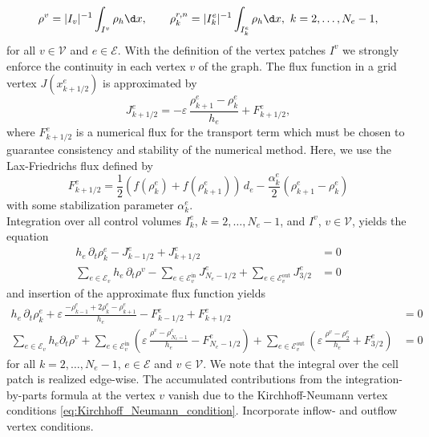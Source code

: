 \begin{align*}	
	\rho^{v}= |I_v|^{-1}\int_{I^v}\rho_h\d x, \qquad
	\rho_k^{r,n} = |I_k^e|^{-1}\int_{I_k^e} \rho_h\d x,\ k=2,\ldots,N_e-1,
\end{align*}
for all $v \in \mathcal{V}$ and $e \in \mathcal{E}$. With the definition of the vertex patches $I^v$ we strongly enforce the continuity in each vertex $v$ of the graph. The flux function in a grid vertex $J(x^e_{k+1/2})$ is approximated by
\begin{equation*}
	J_{k+1/2}^e = -\varepsilon\,\frac{\rho_{k+1}^e-\rho_k^e}{h_e}
	+ F^e_{k+1/2},
\end{equation*}
where $F^e_{k+1/2}$ is a numerical flux for the transport term which must be chosen to guarantee consistency and stability of the numerical method. Here, we use the Lax-Friedrichs flux defined by
\begin{equation*}
	F^e_{k+1/2} = \frac{1}{2} (f(\rho_k^e) + f(\rho_{k+1}^e))\,d_e - \frac{\alpha_k^e}2
	(\rho_{k+1}^e - \rho_k^e) 
\end{equation*}
with some stabilization parameter $\alpha_k^e$. \\
Integration over all control volumes $I_k^e$, $k=2,\ldots,N_e-1$, and $I^v$, $v\in \mathcal{V}$, yields the equation
\begin{align*}
	h_e\,\partial_t \rho_k^e - J^e_{k-1/2} + J^e_{k+1/2} &= 0 \\
	\sum_{e\in \mathcal{E}_v} h_e\,\partial_t \rho^v
	- \sum_{e\in \mathcal{E}_v^{\text{in}}} J^e_{N_e-1/2} 
	+ \sum_{e\in \mathcal{E}_v^{\text{out}}} J^e_{3/2} &= 0
\end{align*}
and insertion of the approximate flux function yields
\begin{align*}
	h_e\,\partial_t \rho_k^e + \varepsilon\,\frac{-\rho_{k-1}^e +
	2\rho_k^e - \rho_{k+1}^e}{h_e} - F_{k-1/2}^e + F_{k+1/2}^e &= 0
	  \\
	\sum_{e\in \mathcal{E}_v} h_e\partial_t\rho^v
	+ \sum_{e\in \mathcal{E}_v^{\text{in}}}
	\left(\varepsilon\,\frac{\rho^v-\rho_{N_e-1}^e}{h_e} -
	F^e_{N_e-1/2}\right)
	+ \sum_{e\in \mathcal{E}_v^{\text{out}}}
	\left(\varepsilon\,\frac{\rho^v-\rho_2^e}{h_e} + F^e_{3/2}\right)
	&= 0
\end{align*}
for all $k = 2,\ldots,N_e-1$, $e\in \mathcal{E}$ and $v \in \mathcal{V}$. We note that the integral over the cell patch is realized edge-wise. The accumulated contributions from the integration-by-parts formula at the vertex $v$ vanish due to the Kirchhoff-Neumann vertex conditions \eqref{eq:Kirchhoff_Neumann_condition}. Incorporate inflow- and outflow vertex conditions. \\
